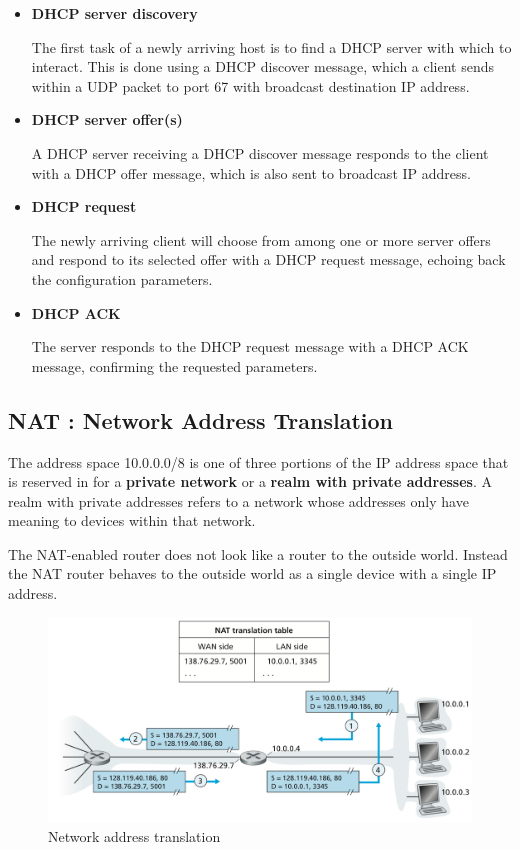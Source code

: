 \documentclass[11pt]{article}
\begin{document}
\begin{itemize}
	\item \textbf{DHCP server discovery}
	
	The first task of a newly arriving host is to find a DHCP server with which to interact. This is done using a DHCP discover message, which a client sends within a UDP packet to port 67 with broadcast destination IP address.
	
	\item \textbf{DHCP server offer(s)}
	
	A DHCP server receiving a DHCP discover message responds to the client with a DHCP offer message, which is also sent to broadcast IP address.
	
	\item \textbf{DHCP request}

	The newly arriving client will choose from among one or more server offers and respond to its selected offer with a DHCP request message, echoing back the configuration parameters.
	
	\item \textbf{DHCP ACK}
	
	The server responds to the DHCP request message with a DHCP ACK message, confirming the requested parameters.
	
\end{itemize}



\subsection{NAT : Network Address Translation}

The address space 10.0.0.0/8 is one of three portions of the IP address space that is reserved in for a \textbf{private network} or a \textbf{realm with private addresses}. A realm with private addresses refers to a network whose addresses only have meaning to devices within that network. 

The NAT-enabled router does not look like a router to the outside world. Instead the NAT router behaves to the outside world as a single device with a single IP address. 

\begin{figure}[h]
	\centering
	\includegraphics[width=0.8\linewidth]{images/NAT.png}
	\caption{Network address translation}
	\label{fig:NAT}
\end{figure}
\end{document}
